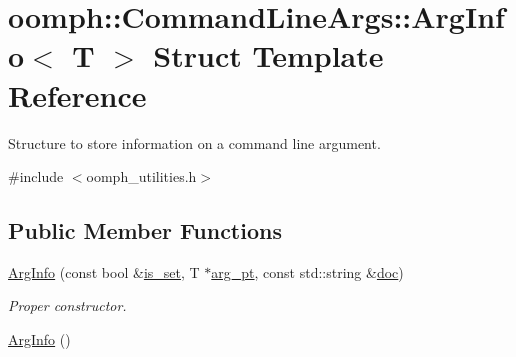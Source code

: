 \hypertarget{structoomph_1_1CommandLineArgs_1_1ArgInfo}{}\section{oomph\+:\+:Command\+Line\+Args\+:\+:Arg\+Info$<$ T $>$ Struct Template Reference}
\label{structoomph_1_1CommandLineArgs_1_1ArgInfo}


Structure to store information on a command line argument.  




{\ttfamily \#include $<$oomph\+\_\+utilities.\+h$>$}

\subsection*{Public Member Functions}
\begin{DoxyCompactItemize}
\item 
\hyperlink{structoomph_1_1CommandLineArgs_1_1ArgInfo_ad20c82222bfd72e5139590b2832136cc}{Arg\+Info} (const bool \&\hyperlink{structoomph_1_1CommandLineArgs_1_1ArgInfo_af45e9ad65b7fa4e29eed6a1e13b5d1e9}{is\+\_\+set}, T $\ast$\hyperlink{structoomph_1_1CommandLineArgs_1_1ArgInfo_a28a76e6c1d710bffb4cc9bc0e93332fd}{arg\+\_\+pt}, const std\+::string \&\hyperlink{structoomph_1_1CommandLineArgs_1_1ArgInfo_ab6bd266840a459d7171a3f532630564d}{doc})
\begin{DoxyCompactList}\small\item\em Proper constructor. \end{DoxyCompactList}\item 
\hyperlink{structoomph_1_1CommandLineArgs_1_1ArgInfo_a1dc69aa3f31ccc1b163156df58757dd8}{Arg\+Info} ()
\end{DoxyCompactItemize}
